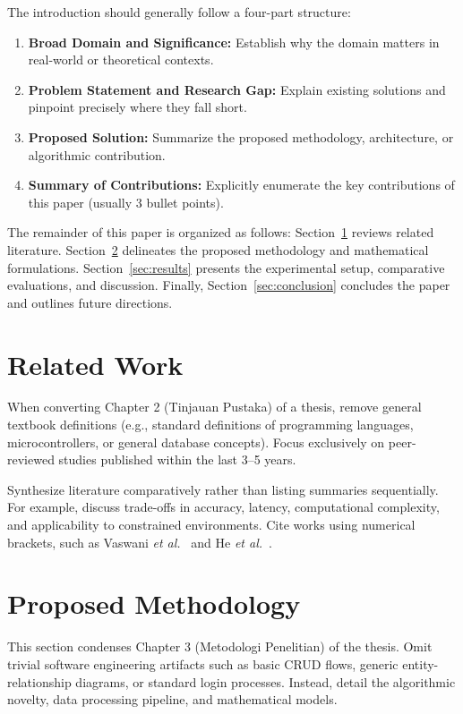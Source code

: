 \documentclass[conference]{IEEEtran}
\begin{document}
The introduction should generally follow a four-part structure:
\begin{enumerate}
    \item \textbf{Broad Domain and Significance:} Establish why the domain matters in real-world or theoretical contexts.
    \item \textbf{Problem Statement and Research Gap:} Explain existing solutions and pinpoint precisely where they fall short.
    \item \textbf{Proposed Solution:} Summarize the proposed methodology, architecture, or algorithmic contribution.
    \item \textbf{Summary of Contributions:} Explicitly enumerate the key contributions of this paper (usually 3 bullet points).
\end{enumerate}

The remainder of this paper is organized as follows: Section~\ref{sec:related_work} reviews related literature. Section~\ref{sec:methodology} delineates the proposed methodology and mathematical formulations. Section~\ref{sec:results} presents the experimental setup, comparative evaluations, and discussion. Finally, Section~\ref{sec:conclusion} concludes the paper and outlines future directions.

\section{Related Work}
\label{sec:related_work}
When converting Chapter 2 (Tinjauan Pustaka) of a thesis, remove general textbook definitions (e.g., standard definitions of programming languages, microcontrollers, or general database concepts). Focus exclusively on peer-reviewed studies published within the last 3--5 years.

Synthesize literature comparatively rather than listing summaries sequentially. For example, discuss trade-offs in accuracy, latency, computational complexity, and applicability to constrained environments. Cite works using numerical brackets, such as Vaswani \textit{et al.}~\cite{vaswani2017attention} and He \textit{et al.}~\cite{he2016deep}.

\section{Proposed Methodology}
\label{sec:methodology}
This section condenses Chapter 3 (Metodologi Penelitian) of the thesis. Omit trivial software engineering artifacts such as basic CRUD flows, generic entity-relationship diagrams, or standard login processes. Instead, detail the algorithmic novelty, data processing pipeline, and mathematical models.
\end{document}
